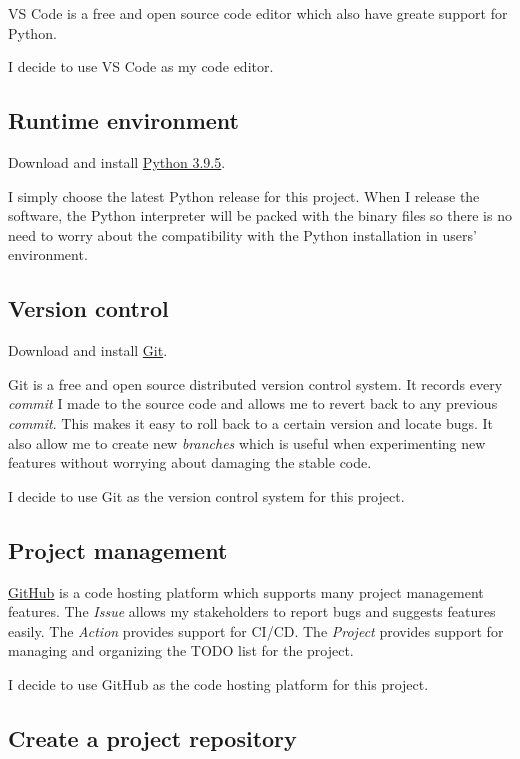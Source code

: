\documentclass[a4paper]{report}
\begin{document}
VS Code is a free and open source code editor which also have greate support for Python.

I decide to use VS Code as my code editor.

\subsection{Runtime environment}

Download and install \href{https://www.python.org/downloads/}{Python 3.9.5}.

I simply choose the latest Python release for this project. When I release the software, the Python interpreter will be packed with the binary files so there is no need to worry about the compatibility with the Python installation in users' environment.

\subsection{Version control}

Download and install \href{https://git-scm.com/}{Git}.

Git is a free and open source distributed version control system. It records every \emph{commit} I made to the source code and allows me to revert back to any previous \emph{commit}. This makes it easy to roll back to a certain version and locate bugs. It also allow me to create new \emph{branches} which is useful when experimenting new features without worrying about damaging the stable code.

I decide to use Git as the version control system for this project.

\subsection{Project management}

\href{https://github.com}{GitHub} is a code hosting platform which supports many project management features. The \emph{Issue} allows my stakeholders to report bugs and suggests features easily. The \emph{Action} provides support for CI/CD. The \emph{Project} provides support for managing and organizing the TODO list for the project.

I decide to use GitHub as the code hosting platform for this project.

\subsection{Create a project repository}
\end{document}
